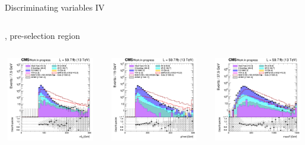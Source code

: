 \documentclass[8pt]{beamer}
\begin{document}
\begin{frame}{Discriminating variables IV}
\begin{columns}
\begin{column}{1.09\textwidth}
\begin{block}{, pre-selection region}\end{block} \vspace{5pt}
\end{column}
\end{columns} \vspace{-5pt}
\begin{columns}
		\begin{column}{0.33\textwidth}
			\begin{center}
     			\includegraphics[width=1.0\textwidth, height=105pt]{figs/2018/SmearSR-ttDM-scalar100/log_cratio_topCR_ll_mt2ll.png}
    		\end{center}		
		\end{column} 
		\begin{column}{0.33\textwidth}
			\begin{center}
     			\includegraphics[width=1.0\textwidth, height=105pt]{figs/2018/SmearSR-ttDM-scalar100/log_cratio_topCR_ll_METcorrected_pt.png}
    		\end{center}		
		\end{column} 
		\begin{column}{0.33\textwidth}
			\begin{center}
     			\includegraphics[width=1.0\textwidth, height=105pt]{figs/2018/SmearSR-ttDM-scalar100/log_cratio_topCR_ll_massT.png}

\end{center}
\end{column}
\end{columns}
\end{frame}
\end{document}
